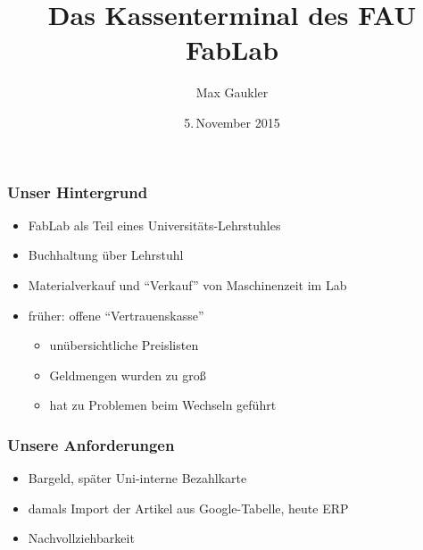 \documentclass[german]{beamer} %
\title{Das Kassenterminal des FAU FabLab}
\author{Max Gaukler}
\date{5.\,November 2015}
\begin{document}

\maketitle




\begin{frame}
\frametitle{Unser Hintergrund}
\begin{itemize}
 \item FabLab als Teil eines Universitäts-Lehrstuhles
 \item Buchhaltung über Lehrstuhl
 \item Materialverkauf und \enquote{Verkauf} von Maschinenzeit im Lab
 \item früher: offene \enquote{Vertrauenskasse}
   \begin{itemize}
   	\item unübersichtliche Preislisten
   	\item Geldmengen wurden zu groß
    \item hat zu Problemen beim Wechseln geführt
   \end{itemize} 	
\end{itemize}	 
\end{frame}

\begin{frame}
\frametitle{Unsere Anforderungen}
 \begin{itemize}
 	\item Bargeld, später Uni-interne Bezahlkarte
 	\item damals Import der Artikel aus Google-Tabelle, heute ERP
	\item Nachvollziehbarkeit
 \end{itemize}
\end{frame}
\end{document}
